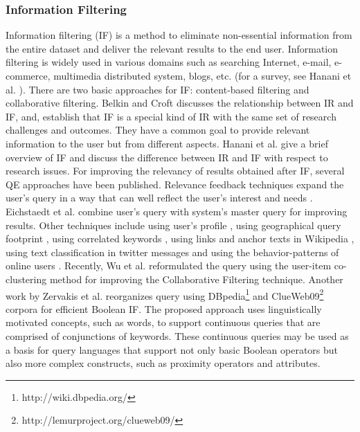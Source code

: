 \subsubsection{Information Filtering} 
Information filtering (IF) is a method to eliminate non-essential information from the entire dataset and deliver the relevant results to the end user. Information filtering is widely used in various domains such as searching Internet, e-mail, e-commerce, multimedia distributed system, blogs, etc. (for a survey, see Hanani et al. \cite{hanani2001information}). There are two basic approaches for IF: content-based filtering and collaborative filtering. Belkin and Croft \cite{belkin1992information} discusses the relationship between IR and IF, and, establish that IF is a special kind of IR with the same set of research challenges and outcomes. They have a common goal to provide relevant information to the user but from different aspects. Hanani et al. \cite{hanani2001information} give a brief overview of IF and discuss the difference between IR and IF with respect to research issues. For improving the relevancy of results obtained after IF, several QE approaches have been published. Relevance feedback techniques expand the user's query in a way that can well reflect the user's interest and needs \cite{allan1996incremental}. Eichstaedt et al. \cite{eichstaedt2002system} combine user's query with system's master query for improving results.  Other techniques include using user's profile \cite{yu2004nonparametric}, using geographical query footprint \cite{fu2005ontology}, using correlated keywords \cite{zimmer2008exploiting}, using links and anchor texts in Wikipedia \cite{arguello2008document}, using text classification in twitter messages \cite{sriram2010short} and using the behavior-patterns of online users \cite{zhang2012behavior,gao2015pattern}. Recently, Wu et al. \cite{wu2016cccf} reformulated the query using the user-item co-clustering method for improving the Collaborative Filtering technique. Another work  by Zervakis et al. \cite{zervakis2017query} reorganizes query using  DBpedia\footnote{http://wiki.dbpedia.org/} and ClueWeb09\footnote{http://lemurproject.org/clueweb09/} corpora for efficient Boolean IF. The proposed approach uses linguistically motivated concepts, such as words, to support continuous queries that are comprised of conjunctions of keywords. These continuous queries may be used as a basis for query languages that support not only basic Boolean operators but also more complex constructs, such as proximity operators and attributes. 
